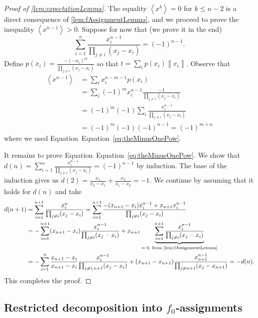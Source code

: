 \documentclass{article}
\begin{document}
\begin{proof}[Proof of \ref{lem:expectationLemma}]
	The equality $\left\langle x^{k}\right\rangle =0$ for $k\leq n-2$ is a direct consequence of \ref{lem:fAssignmentLemma}, and we proceed to  prove the inequality $\left\langle x^{n-1}\right\rangle >0$. 
	Suppose for now that (we prove it in the end)
	\begin{equation}
		\sum_{i=1}^n\frac{x_i^{n-1}}{\prod_{j\neq i}(x_j-x_i)} = (-1)^{n-1}. 
		\label{eq:theMinusOnePow}
	\end{equation}
	Define $p(x_{i})=\frac{-(-x_{i})^{m}}{\prod_{j\neq i}(x_{j}-x_{i})}$ so that $t=\sum_{i}p(x_{i})\left\llbracket x_{i}\right\rrbracket $.
	Observe that 
	\begin{align*}
	\left\langle x^{n-1}\right\rangle  & =\sum_{i}x_{i}^{n-m-1}p(x_{i})\\
	& =\sum_{i}(-1)^{m}x_{i}^{n-1}\frac{-1}{\prod_{j\neq i}(x_{j}-x_{i})}\\
	& =(-1)^{m}(-1)\sum_{i}\frac{x_{i}^{n-1}}{\prod_{j\neq i}(x_{j}-x_{i})}\\
	& =(-1)^{m}(-1)(-1)^{n-1}=(-1)^{m+n}
	\end{align*}
	where we used Equation~Equation~\eqref{eq:theMinusOnePow}.

	It remains to prove Equation~Equation~\eqref{eq:theMinusOnePow}. We show that $d(n)=\sum_{i=1}^n\frac{x_i^{n-1}}{\prod_{j\neq i}(x_j-x_i)}=(-1)^{n-1}$ by induction. %
	The base of  the induction gives us $d(2)=\frac{x_1}{x_2-x_1}+\frac{x_2}{x_1-x_2}=-1$. We continue by assuming that it holds for $d(n)$ and take
	\begin{align*}
		d(n+1)&=\sum_{i=1}^{n+1}\frac{x_i^n}{\prod_{j\neq i}(x_j-x_i)}=\sum_{i=1}^{n+1}\frac{-(x_{n+1}-x_i)x_i^{n-1}+x_{n+1}x_i^{n-1}}{\prod_{j\neq i}(x_j-x_i)}\\
	&=-\sum_{i=1}^{n+1}(x_{n+1}-x_i)\frac{x_i^{n-1}}{\prod_{j\neq i}(x_j-x_i)}+x_{n+1}\underbrace{\sum_{i=1}^{n+1}\frac{x_i^{n-1}}{\prod_{j\neq i}(x_j-x_i)}}_{\text{$=0$, from \ref{lem:fAssignmentLemma}}}\\
	&=-\sum_{i=1}^{n}\frac{x_{n+1}-x_i}{x_{n+1}-x_i}\frac{x_i^{n-1}}{\prod_{j\neq i,n+1}(x_j-x_i)}+(x_{n+1}-x_{n+1})\frac{x_{n+1}^{n-1}}{\prod_{j\neq n+1}(x_j-x_{n+1})}=-d(n).
	\end{align*}
	This completes the proof.
\end{proof}



\subsection{Restricted decomposition into \texorpdfstring{$f_{0}$}{f0}-assignments}\label{subsec:Restricted-decomposition-into-monomials}
\end{document}
